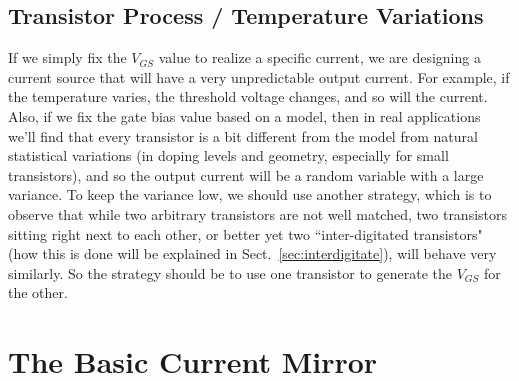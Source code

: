 \subsection{Transistor Process / Temperature Variations}
If we simply fix the $V_{GS}$ value to realize a specific current, we are designing a current source that will have a very unpredictable output current.  For example, if the temperature varies, the threshold voltage changes, and so will the current.  Also, if we fix the gate bias value based on a model, then in real applications we'll find that every transistor is a bit different from the model from natural statistical variations (in doping levels and geometry, especially for small transistors), and so the output current will be a random variable with a large variance.  To keep the variance low, we should use another strategy, which is to observe that while two arbitrary transistors are not well matched, two transistors sitting right next to each other, or better yet two ``inter-digitated transistors" (how this is done will be explained in Sect.~\ref{sec:interdigitate}), will behave very similarly. So the strategy should be to use one transistor to generate the $V_{GS}$ for the other.
\section{The Basic Current Mirror}
